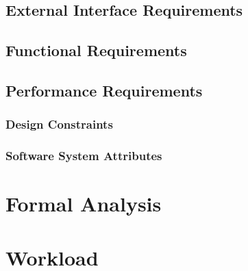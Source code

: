 \documentclass[a4paper, oneside]{book}
\begin{document}
\section{External Interface Requirements}
\section{Functional Requirements}
\section{Performance Requirements}
\subsection{Design Constraints}
\subsection{Software System Attributes}

\chapter{Formal Analysis}

\chapter{Workload}

\printbibliography
\end{document}
